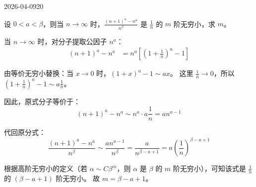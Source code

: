 \begin{mistake}{2026-04-09}{20}

\begin{problemcontent}
设 \( 0 < a < \beta \)，则当 \( n \to \infty \) 时，\( \frac{(n+1)^a - n^a}{n^\beta} \) 是 \( \frac{1}{n} \) 的 \( m \) 阶无穷小，求 \( m \)。
\end{problemcontent}

\begin{solutioncontent}
当 \(n \to \infty\) 时，对分子提取公因子 \(n^a\)：
\[
\begin{aligned}
(n+1)^a - n^a &= n^a \left[ \left(1 + \frac{1}{n}\right)^a - 1 \right]
\end{aligned}
\]

由等价无穷小替换：当 \(x \to 0\) 时，\((1+x)^a - 1 \sim ax\)。
这里 \(\frac{1}{n} \to 0\)，所以 \(\left(1 + \frac{1}{n}\right)^a - 1 \sim a \frac{1}{n}\)。

因此，原式分子等价于：
\[
(n+1)^a - n^a \sim n^a \cdot a \frac{1}{n} = a n^{a-1}
\]

代回原分式：
\[
\frac{(n+1)^a - n^a}{n^\beta} \sim \frac{a n^{a-1}}{n^\beta} = \frac{a}{n^{\beta - a + 1}} = a \left( \frac{1}{n} \right)^{\beta - a + 1}
\]

根据高阶无穷小的定义（若 \(\alpha \sim C \beta^m\)，则 \(\alpha\) 是 \(\beta\) 的 \(m\) 阶无穷小），可知该式是 \(\frac{1}{n}\) 的 \((\beta - a + 1)\) 阶无穷小。
故 \(m = \beta - a + 1\)。
\end{solutioncontent}


\end{mistake}
